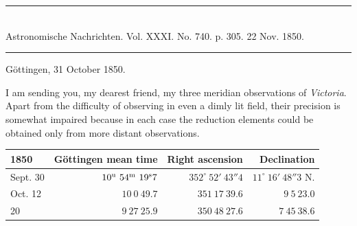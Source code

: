 \clearpage
\hypertarget{native-483-victoria}{}
\begin{center}
\rule{0.55\linewidth}{0.4pt}\\[2pt]
Astronomische Nachrichten. Vol. XXXI. No. 740. p. 305. 22 Nov. 1850.\\[2pt]
\rule{0.55\linewidth}{0.4pt}
\end{center}
\begin{flushright}Göttingen, 31 October 1850.\end{flushright}

I am sending you, my dearest friend, my three meridian observations of \emph{Victoria}. Apart from the difficulty of observing in even a dimly lit field, their precision is somewhat impaired because in each case the reduction elements could be obtained only from more distant observations.

\begin{center}
\setlength{\tabcolsep}{3pt}
\begin{tabular}{l|r|r|r}
1850 & Göttingen mean time & Right ascension & Declination \\\hline
Sept. 30 & $10^{\rm u}\ 54^{\rm m}\ 19^{\rm s}7$ & $352^\circ\ 52'\ 43''4$ & $11^\circ\ 16'\ 48''3$ N. \\
Oct. 12 & $10\ 0\ 49.7$ & $351\ 17\ 39.6$ & $9\ 5\ 23.0$ \\
\hfill 20 & $9\ 27\ 25.9$ & $350\ 48\ 27.6$ & $7\ 45\ 38.6$ \\
\end{tabular}
\end{center}
